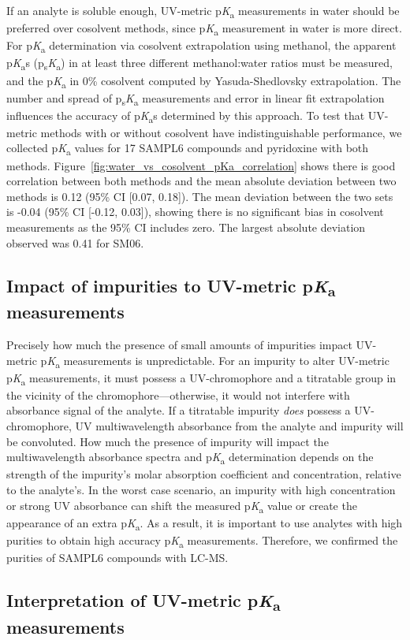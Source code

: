 \documentclass[9pt,lineno]{elife}
\newcommand{\pKa}{p\textit{K}\textsubscript{a}}
\newcommand{\psKa}{p\textsubscript{s}\textit{K}\textsubscript{a}}
\begin{document}
If an analyte is soluble enough, UV-metric \pKa{} measurements in water should be preferred over cosolvent methods, since \pKa{} measurement in water is more direct. 
For \pKa{} determination via cosolvent extrapolation using methanol, the apparent \pKa{}s (\psKa) in at least three different methanol:water ratios must be measured, and the \pKa{} in 0\% cosolvent computed by Yasuda-Shedlovsky extrapolation. 
The number and spread of \psKa{} measurements and error in linear fit extrapolation influences the accuracy of \pKa{}s determined by this approach. 
To test that UV-metric methods with or without cosolvent have indistinguishable performance, we collected \pKa{} values for 17 SAMPL6 compounds and pyridoxine with both methods. 
Figure~\ref{fig:water_vs_cosolvent_pKa_correlation} shows there is good correlation between both methods and the mean absolute deviation between two methods is 0.12 (95\% CI [0.07, 0.18]). 
The mean deviation between the two sets is -0.04 (95\% CI [-0.12, 0.03]), showing there is no significant bias in cosolvent measurements as the 95\% CI includes zero. 
The largest absolute deviation observed was 0.41 for SM06. 


\subsection{Impact of impurities to UV-metric \pKa{} measurements}

Precisely how much the presence of small amounts of impurities impact UV-metric \pKa{} measurements is unpredictable. 
For an impurity to alter UV-metric \pKa{} measurements, it must possess a UV-chromophore and a titratable group in the vicinity of the chromophore---otherwise, it would not interfere with absorbance signal of the analyte. 
If a titratable impurity \emph{does} possess a UV-chromophore, UV multiwavelength absorbance from the analyte and impurity will be convoluted. 
How much the presence of impurity will impact the multiwavelength absorbance spectra and \pKa{} determination depends on the strength of the impurity's molar absorption coefficient and concentration, relative to the analyte's. 
In the worst case scenario, an impurity with high concentration or strong UV absorbance can shift the measured \pKa{} value or create the appearance of an extra \pKa. 
As a result, it is important to use analytes with high purities to obtain high accuracy \pKa{} measurements. 
Therefore, we confirmed the purities of SAMPL6 compounds with LC-MS.   

\subsection{Interpretation of UV-metric \pKa{} measurements}
\end{document}
